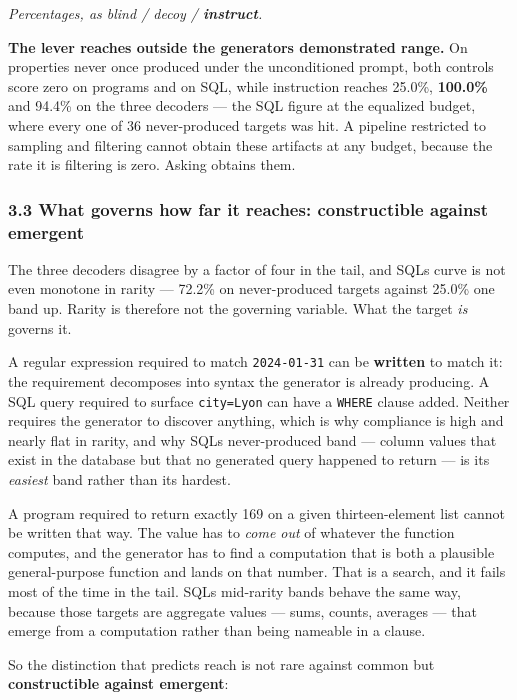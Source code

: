 \documentclass[
  10pt,
]{article}
\theoremstyle{plain}
\theoremstyle{definition}
\begin{document}
\emph{Percentages, as blind / decoy / \textbf{instruct}.}

\textbf{The lever reaches outside the generator\textquotesingle s
demonstrated range.} On properties never once produced under the
unconditioned prompt, both controls score zero on programs and on SQL,
while instruction reaches 25.0\%, \textbf{100.0\%} and 94.4\% on the
three decoders --- the SQL figure at the equalized budget, where every
one of 36 never-produced targets was hit. A pipeline restricted to
sampling and filtering cannot obtain these artifacts at any budget,
because the rate it is filtering is zero. Asking obtains them.

\subsubsection{3.3 What governs how far it reaches: constructible
against
emergent}\label{33-what-governs-how-far-it-reaches-constructible-against-emergent}

The three decoders disagree by a factor of four in the tail, and
SQL\textquotesingle s curve is not even monotone in rarity --- 72.2\% on
never-produced targets against 25.0\% one band up. Rarity is therefore
not the governing variable. What the target \emph{is} governs it.

A regular expression required to match \texttt{2024-01-31} can be
\textbf{written} to match it: the requirement decomposes into syntax the
generator is already producing. A SQL query required to surface
\texttt{city=Lyon} can have a \texttt{WHERE} clause added. Neither
requires the generator to discover anything, which is why compliance is
high and nearly flat in rarity, and why SQL\textquotesingle s
never-produced band --- column values that exist in the database but
that no generated query happened to return --- is its \emph{easiest}
band rather than its hardest.

A program required to return exactly 169 on a given thirteen-element
list cannot be written that way. The value has to \emph{come out} of
whatever the function computes, and the generator has to find a
computation that is both a plausible general-purpose function and lands
on that number. That is a search, and it fails most of the time in the
tail. SQL\textquotesingle s mid-rarity bands behave the same way,
because those targets are aggregate values --- sums, counts, averages
--- that emerge from a computation rather than being nameable in a
clause.

So the distinction that predicts reach is not rare against common but
\textbf{constructible against emergent}:
\end{document}
